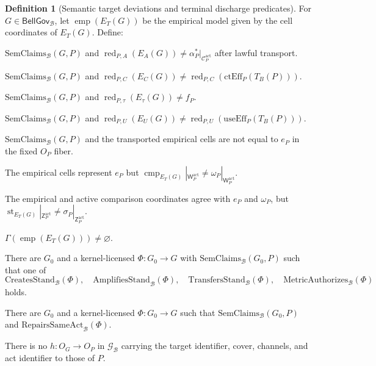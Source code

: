 \documentclass[11pt]{article}
\theoremstyle{definition}
\newtheorem{definition}[theorem]{Definition}
\newcommand{\Bell}{\mathcal{B}}
\newcommand{\BellLaw}{\mathscr{G}_{\Bell}}
\newcommand{\GlobalSec}{\Gamma}
\newcommand{\BellGov}{\mathsf{BellGov}_{\Bell}}
\newcommand{\SemClaims}{\mathrm{SemClaims}_{\Bell}}
\newcommand{\CreatesStand}{\mathrm{CreatesStand}_{\Bell}}
\newcommand{\AmplifiesStand}{\mathrm{AmplifiesStand}_{\Bell}}
\newcommand{\TransfersStand}{\mathrm{TransfersStand}_{\Bell}}
\newcommand{\RepairsAct}{\mathrm{RepairsSameAct}_{\Bell}}
\newcommand{\MetricAuth}{\mathrm{MetricAuthorizes}_{\Bell}}
\newcommand{\ContEff}{\mathrm{ctEff}_{P}}
\newcommand{\ReuseEff}{\mathrm{useEff}_{P}}
\newcommand{\Active}{\mathrm{act}}
\begin{document}
\begin{definition}[Semantic target deviations and terminal discharge predicates]\label{def:jointdischarge}
For $G\in\BellGov$, let $\operatorname{emp}(E_T(G))$ be the empirical model given by the cell coordinates of $E_T(G)$. Define:
\begin{description}[leftmargin=3.2em,style=nextline]
\item[$\operatorname{AnchorDeviation}(G)$]
$\SemClaims(G,P)$ and $\operatorname{red}_{P,A}(E_A(G))\neq\alpha_P^*|_{\mathcal C_P^{\Active}}$ after lawful transport.
\item[$\operatorname{ContinuationDeviation}(G)$]
$\SemClaims(G,P)$ and $\operatorname{red}_{P,C}(E_C(G))\neq\operatorname{red}_{P,C}(\ContEff(T_B(P)))$.
\item[$\operatorname{ActTimeDeviation}(G)$]
$\SemClaims(G,P)$ and $\operatorname{red}_{P,\tau}(E_{\tau}(G))\neq f_P$.
\item[$\operatorname{ReuseDeviation}(G)$]
$\SemClaims(G,P)$ and $\operatorname{red}_{P,U}(E_U(G))\neq\operatorname{red}_{P,U}(\ReuseEff(T_B(P)))$.
\item[$\operatorname{EmpiricalDeviation}(G)$]
$\SemClaims(G,P)$ and the transported empirical cells are not equal to $e_P$ in the fixed $O_P$ fiber.
\item[$\operatorname{ComparisonDeviation}(G)$]
The empirical cells represent $e_P$ but $\operatorname{cmp}_{E_T(G)}|_{\mathsf W_P^{\Active}}\neq\omega_P|_{\mathsf W_P^{\Active}}$.
\item[$\operatorname{StandingTokenDeviation}(G)$]
The empirical and active comparison coordinates agree with $e_P$ and $\omega_P$, but $\operatorname{st}_{E_T(G)}|_{\mathsf Z_P^{\Active}}\neq\sigma_P|_{\mathsf Z_P^{\Active}}$.
\item[$\operatorname{BellLocalCompletion}(G)$]
$\GlobalSec(\operatorname{emp}(E_T(G)))\neq\varnothing$.
\item[$\operatorname{StandingFlow}(G)$]
There are $G_0$ and a kernel-licensed $\Phi:G_0\to G$ with $\SemClaims(G_0,P)$ such that one of
\[
\CreatesStand(\Phi),\quad \AmplifiesStand(\Phi),\quad
\TransfersStand(\Phi),\quad \MetricAuth(\Phi)
\]
holds.
\item[$\operatorname{SameActRepair}(G)$]
There are $G_0$ and a kernel-licensed $\Phi:G_0\to G$ such that $\SemClaims(G_0,P)$ and $\RepairsAct(\Phi)$.
\item[$\operatorname{ScopeChange}(G)$]
There is no $h:O_G\to O_P$ in $\BellLaw$ carrying the target identifier, cover, channels, and act identifier to those of $P$.
\end{description}
\end{definition}
\end{document}

